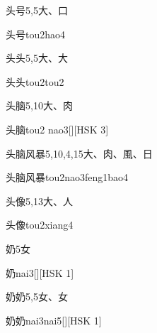 \begin{entry}{头号}{5,5}{⼤、⼝}
  \begin{phonetics}{头号}{tou2hao4}
  \end{phonetics}
\end{entry}

\begin{entry}{头头}{5,5}{⼤、⼤}
  \begin{phonetics}{头头}{tou2tou2}
  \end{phonetics}
\end{entry}

\begin{entry}{头脑}{5,10}{⼤、⾁}
  \begin{phonetics}{头脑}{tou2 nao3}[][HSK 3]
  \end{phonetics}
\end{entry}

\begin{entry}{头脑风暴}{5,10,4,15}{⼤、⾁、⾵、⽇}
  \begin{phonetics}{头脑风暴}{tou2nao3feng1bao4}
  \end{phonetics}
\end{entry}

\begin{entry}{头像}{5,13}{⼤、⼈}
  \begin{phonetics}{头像}{tou2xiang4}
  \end{phonetics}
\end{entry}

\begin{entry}{奶}{5}{⼥}
  \begin{phonetics}{奶}{nai3}[][HSK 1]
  \end{phonetics}
\end{entry}

\begin{entry}{奶奶}{5,5}{⼥、⼥}
  \begin{phonetics}{奶奶}{nai3nai5}[][HSK 1]
  \end{phonetics}
\end{entry}

